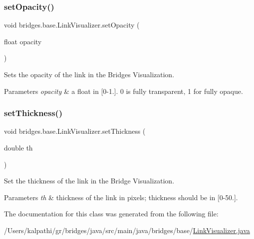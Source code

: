 \subsubsection{\texorpdfstring{setOpacity()}{setOpacity()}}
{\footnotesize\ttfamily void bridges.\+base.\+Link\+Visualizer.\+set\+Opacity (\begin{DoxyParamCaption}\item[{float}]{opacity }\end{DoxyParamCaption})}



Sets the opacity of the link in the Bridges Visualization. 


\begin{DoxyParams}{Parameters}
{\em opacity} & a float in \mbox{[}0-\/1.\mbox{]}. 0 is fully transparent, 1 for fully opaque. \\
\hline
\end{DoxyParams}
\mbox{\label{classbridges_1_1base_1_1_link_visualizer_a702e9ca345d1a4a035baf2041f275849}} 
\subsubsection{\texorpdfstring{setThickness()}{setThickness()}}
{\footnotesize\ttfamily void bridges.\+base.\+Link\+Visualizer.\+set\+Thickness (\begin{DoxyParamCaption}\item[{double}]{th }\end{DoxyParamCaption})}



Set the thickness of the link in the Bridge Visualization. 


\begin{DoxyParams}{Parameters}
{\em th} & thickness of the link in pixels; thickness should be in \mbox{[}0-\/50.\mbox{]}. \\
\hline
\end{DoxyParams}


The documentation for this class was generated from the following file\+:\begin{DoxyCompactItemize}
\item 
/\+Users/kalpathi/gr/bridges/java/src/main/java/bridges/base/\mbox{\hyperlink{_link_visualizer_8java}{Link\+Visualizer.\+java}}\end{DoxyCompactItemize}
